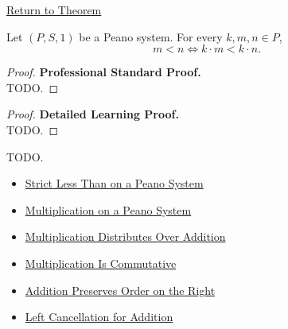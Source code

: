 \newpage
{}
\label{prf:multiplication-preserves-and-reflects-strict-order}

\begin{remark*}[Return]
\hyperref[thm:multiplication-preserves-and-reflects-strict-order]{Return to Theorem}
\end{remark*}

\begin{theorem*}
Let $(P,S,1)$ be a Peano system. For every $k,m,n \in P$,
\[
m<n
\Longleftrightarrow
k\cdot m<k\cdot n.
\]
\end{theorem*}

\begin{proof}
\textbf{Professional Standard Proof.}~\\
TODO.
\end{proof}

\begin{proof}
\textbf{Detailed Learning Proof.}~\\
TODO.
\end{proof}

\begin{remark*}
TODO.
\end{remark*}

\begin{dependencies}
\begin{itemize}
  \item \hyperref[def:strict-less-than-on-peano-system]{Strict Less Than on a Peano System}
  \item \hyperref[def:multiplication-on-peano-system]{Multiplication on a Peano System}
  \item \hyperref[thm:multiplication-distributes-over-addition]{Multiplication Distributes Over Addition}
  \item \hyperref[thm:multiplication-commutative]{Multiplication Is Commutative}
  \item \hyperref[thm:addition-preserves-order-on-right]{Addition Preserves Order on the Right}
  \item \hyperref[thm:addition-left-cancellation]{Left Cancellation for Addition}
\end{itemize}
\end{dependencies}